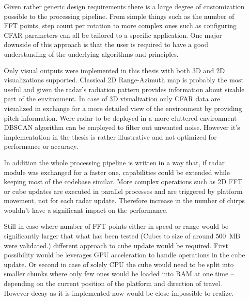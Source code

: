 Given rather generic design requirements there is a large degree of customization possible to the processing pipeline.
From simple things such as the number of FFT points, step count per rotation to more complex ones such as configuring CFAR parameters can all be tailored to a specific application.
One major downside of this approach is that the user is required to have a good understanding of the underlying algorithms and principles.

Only visual outputs were implemented in this thesis with both 3D and 2D visualizations supported.
Classical 2D Range-Azimuth map is probably the most useful and given the radar's radiation pattern provides information about sizable part of the environment.
In case of 3D visualization only CFAR data are visualized in exchange for a more detailed view of the environment by providing pitch information.
Were radar to be deployed in a more cluttered environment DBSCAN algorithm can be employed to filter out unwanted noise.
However it's implementation in the thesis is rather illustrative and not optimized for performance or accuracy.

In addition the whole processing pipeline is written in a way that, if radar module was exchanged for a faster one, capabilities could be extended while keeping most of the codebase similar.
More complex operations such as 2D FFT or cube updates are executed in parallel processes and are triggered by platform movement, not for each radar update.
Therefore increase in the number of chirps wouldn't have a significant impact on the performance.

Still in case where number of FFT points either in speed or range would be significantly larger that what has been tested (Cubes to size of around 500~MB were validated.) different approach to cube update would be required.
First possibility would be leverages GPU acceleration to handle operations in the cube update.
Or second in case of solely CPU the cube would need to be split into smaller chunks where only few ones would be loaded into RAM at one time -- depending on the current position of the platform and direction of travel.
However decay as it is implemented now would be close impossible to realize.



